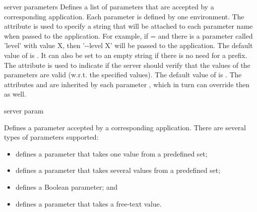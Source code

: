 \bigskip 
\xmlstruct
{server}
{parameters} 
{%
%
  Defines a list of parameters that are accepted by a corresponding
  application. Each parameter is defined by one
   environment.
  The  attribute is used to specify a string
  that will be attached to each parameter name when passed to the
  application.
  For example, if = and
  there is a parameter called 'level' with value X, then '{-}{-}level
  X' will be passed to the application.  The default value of
   is . It can also be set
  to an empty string if there is no need for a prefix.
  The  attribute is used to indicate if the
  server should verify that the values of the parameters are valid
  (w.r.t. the specified values). The default value of
   is .
  The attributes  and  are
  inherited by each parameter , which in turn can
  override then as well.
%
}
{}%

\bigskip
\xmlstruct
{server}
{param}
{%
%
  Defines a parameter accepted by a corresponding application. There
  are several types of parameters supported:
\begin{itemize}
\item {} defines a parameter that takes one
  value from a predefined set;
\item {} defines a parameter that takes several
  values from a predefined set;
\item {} defines a Boolean parameter; and
\item {} defines a parameter that takes a
  free-text value.
\end{itemize}
%
}


